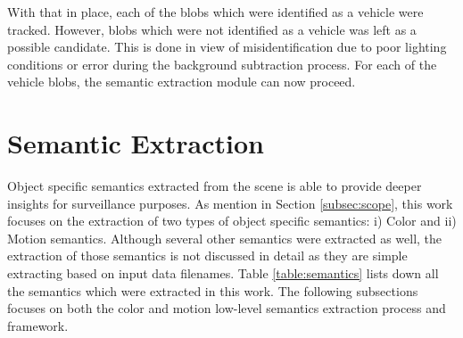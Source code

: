 With that in place, each of the blobs which were identified as a vehicle were tracked. However, blobs which were not identified as a vehicle was left as a possible candidate. This is done in view of misidentification due to poor lighting conditions or error during the background subtraction process. For each of the vehicle blobs, the semantic extraction module can now proceed.  





\section{Semantic Extraction} 
\label{section:semanticsExtraction}

Object specific semantics extracted from the scene is able to provide deeper insights for surveillance purposes. As mention in Section \ref{subsec:scope}, this work focuses on the extraction of two types of object specific semantics: i) Color and ii) Motion semantics. Although several other semantics were extracted as well, the extraction of those semantics is not discussed in detail as they are simple extracting based on input data filenames. Table \ref{table:semantics} lists down all the semantics which were extracted in this work. The following subsections focuses on both the color and motion low-level semantics extraction process and framework.  



